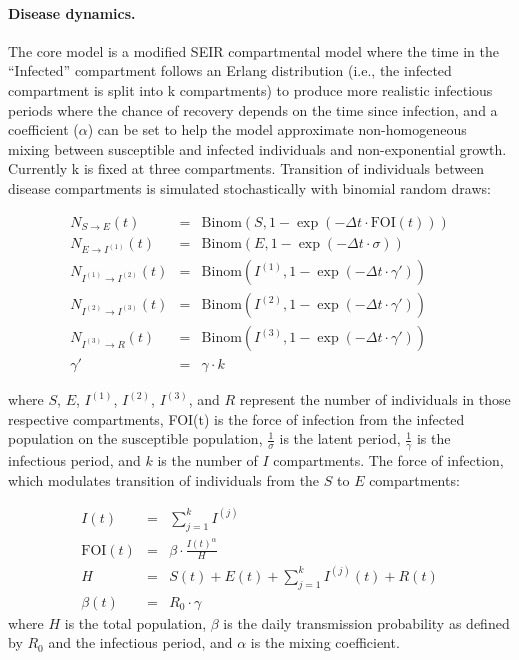 \paragraph{Disease dynamics.} The core model is a modified SEIR compartmental model where the time in the “Infected” compartment follows an Erlang distribution (i.e., the infected compartment is split into k compartments) to produce more realistic infectious periods where the chance of recovery depends on the time since infection\cite{Yan:QuantitativeMethodsInvestigating:2019}, and a coefficient ($\alpha$) can be set to help the model approximate non-homogeneous mixing between susceptible and infected individuals and non-exponential growth\cite{Finkenstadt:StochasticModelExtinction:2002}. Currently k is fixed at three compartments. Transition of individuals between disease compartments is simulated stochastically with binomial random draws:

\begin{eqnarray}
N_{S \to E} (t) &=& \text{Binom}\left(S, 1 - \exp \left(- \Delta t \cdot \text{FOI}(t) \right)\right) \\
N_{E \to I^{( 1)}} (t) &=& \text{Binom}\left(E, 1 - \exp \left(- \Delta t \cdot \sigma  \right) \right) \\
N_{I^{( 1 )} \to I^{( 2)}} (t) &=& \text{Binom}\left(I^{( 1)}, 1 - \exp \left(- \Delta t \cdot \gamma' \right) \right) \\
N_{I^{(2)} \to I^{(3)}} (t) &=& \text{Binom}\left(I^{(2)}, 1 - \exp \left(- \Delta t \cdot \gamma' \right) \right) \\
N_{I^{(3)} \to R} (t) &=& \text{Binom}\left(I^{(3)}, 1 - \exp \left(- \Delta t \cdot \gamma' \right) \right) \\
\gamma' &=& \gamma \cdot k
\end{eqnarray}

where $S$, $E$, $I^{\left(1\right)}$, $I^{\left(2\right)}$, $I^{\left(3\right)}$, and $R$ represent the number of individuals in those respective compartments, FOI(t) is the force of infection from the infected population on the susceptible population, $\frac{1}{\sigma}$ is the latent period, $\frac{1}{\gamma}$ is the infectious period, and $k$ is the number of $I$ compartments. The force of infection, which modulates transition of individuals from the $S$ to $E$ compartments:

\begin{eqnarray}
I(t) &=& \sum\limits_{{j = 1}}^{k} I^{( j)} \\
\text{FOI}(t) &=&\beta \cdot \frac{I{(t)}^{\alpha}}{H} \\
H &=& S(t)+E(t)+\sum_{j=1}^{k} I^{\left(j\right)}(t)+R(t) \\
\beta(t) &=& R_{0}\cdot\gamma
\end{eqnarray}
where $H$ is the total population, $\beta$ is the daily transmission probability as defined by $R_0$ and the infectious period, and $\alpha$ is the mixing coefficient.

